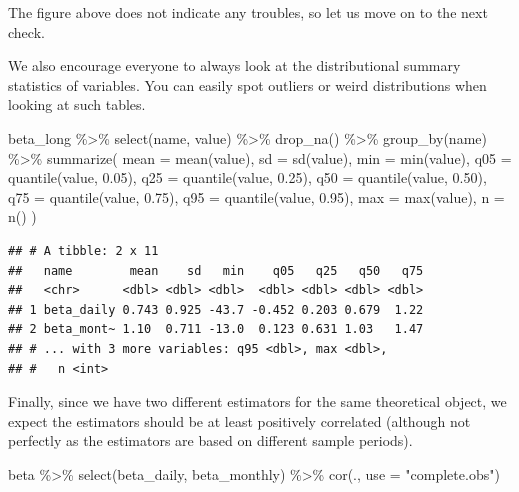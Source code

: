 \documentclass[
]{krantz}
\newenvironment{Shaded}{\begin{snugshade}}{\end{snugshade}}
\newcommand{\AttributeTok}[1]{\textcolor[rgb]{0.61,0.61,0.61}{#1}}
\newcommand{\FloatTok}[1]{\textcolor[rgb]{0.06,0.06,0.06}{#1}}
\newcommand{\FunctionTok}[1]{\textcolor[rgb]{0,0,0}{#1}}
\newcommand{\NormalTok}[1]{#1}
\newcommand{\SpecialCharTok}[1]{\textcolor[rgb]{0,0,0}{#1}}
\newcommand{\StringTok}[1]{\textcolor[rgb]{0.5,0.5,0.5}{#1}}
\begin{document}
The figure above does not indicate any troubles, so let us move on to the next check.

We also encourage everyone to always look at the distributional summary statistics of variables. You can easily spot outliers or weird distributions when looking at such tables.

\begin{Shaded}
\begin{Highlighting}[]
\NormalTok{beta\_long }\SpecialCharTok{\%\textgreater{}\%}
  \FunctionTok{select}\NormalTok{(name, value) }\SpecialCharTok{\%\textgreater{}\%}
  \FunctionTok{drop\_na}\NormalTok{() }\SpecialCharTok{\%\textgreater{}\%}
  \FunctionTok{group\_by}\NormalTok{(name) }\SpecialCharTok{\%\textgreater{}\%}
  \FunctionTok{summarize}\NormalTok{(}
    \AttributeTok{mean =} \FunctionTok{mean}\NormalTok{(value),}
    \AttributeTok{sd =} \FunctionTok{sd}\NormalTok{(value),}
    \AttributeTok{min =} \FunctionTok{min}\NormalTok{(value),}
    \AttributeTok{q05 =} \FunctionTok{quantile}\NormalTok{(value, }\FloatTok{0.05}\NormalTok{),}
    \AttributeTok{q25 =} \FunctionTok{quantile}\NormalTok{(value, }\FloatTok{0.25}\NormalTok{),}
    \AttributeTok{q50 =} \FunctionTok{quantile}\NormalTok{(value, }\FloatTok{0.50}\NormalTok{),}
    \AttributeTok{q75 =} \FunctionTok{quantile}\NormalTok{(value, }\FloatTok{0.75}\NormalTok{),}
    \AttributeTok{q95 =} \FunctionTok{quantile}\NormalTok{(value, }\FloatTok{0.95}\NormalTok{),}
    \AttributeTok{max =} \FunctionTok{max}\NormalTok{(value),}
    \AttributeTok{n =} \FunctionTok{n}\NormalTok{()}
\NormalTok{  )}
\end{Highlighting}
\end{Shaded}

\begin{verbatim}
## # A tibble: 2 x 11
##   name        mean    sd   min    q05   q25   q50   q75
##   <chr>      <dbl> <dbl> <dbl>  <dbl> <dbl> <dbl> <dbl>
## 1 beta_daily 0.743 0.925 -43.7 -0.452 0.203 0.679  1.22
## 2 beta_mont~ 1.10  0.711 -13.0  0.123 0.631 1.03   1.47
## # ... with 3 more variables: q95 <dbl>, max <dbl>,
## #   n <int>
\end{verbatim}

Finally, since we have two different estimators for the same theoretical object, we expect the estimators should be at least positively correlated (although not perfectly as the estimators are based on different sample periods).

\begin{Shaded}
\begin{Highlighting}[]
\NormalTok{beta }\SpecialCharTok{\%\textgreater{}\%}
  \FunctionTok{select}\NormalTok{(beta\_daily, beta\_monthly) }\SpecialCharTok{\%\textgreater{}\%}
  \FunctionTok{cor}\NormalTok{(., }\AttributeTok{use =} \StringTok{"complete.obs"}\NormalTok{)}
\end{Highlighting}
\end{Shaded}
\end{document}
